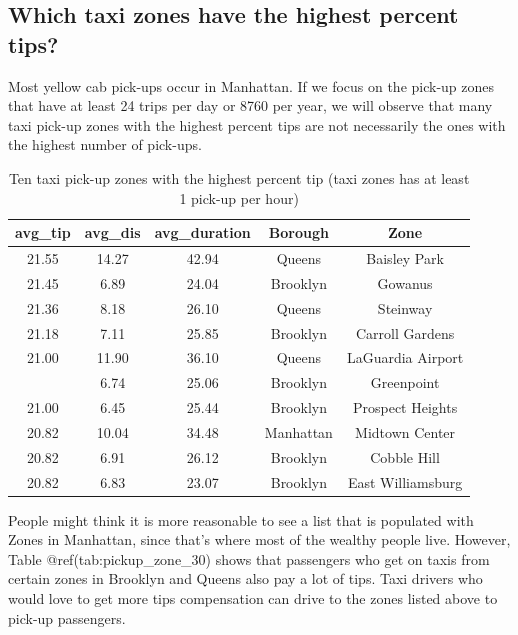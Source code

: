 \documentclass[12pt,twoside]{reedthesis}
\newenvironment{Shaded}{\begin{snugshade}}{\end{snugshade}}
\newcommand{\KeywordTok}[1]{\textcolor[rgb]{0.13,0.29,0.53}{\textbf{#1}}}
\newcommand{\DecValTok}[1]{\textcolor[rgb]{0.00,0.00,0.81}{#1}}
\newcommand{\StringTok}[1]{\textcolor[rgb]{0.31,0.60,0.02}{#1}}
\newcommand{\CommentTok}[1]{\textcolor[rgb]{0.56,0.35,0.01}{\textit{#1}}}
\newcommand{\OperatorTok}[1]{\textcolor[rgb]{0.81,0.36,0.00}{\textbf{#1}}}
\newcommand{\NormalTok}[1]{#1}
\theoremstyle{definition}
\theoremstyle{definition}
\theoremstyle{definition}
\theoremstyle{remark}
\begin{document}
\subsection{Which taxi zones have the highest percent
tips?}\label{which-taxi-zones-have-the-highest-percent-tips}

Most yellow cab pick-ups occur in Manhattan. If we focus on the pick-up
zones that have at least 24 trips per day or 8760 per year, we will
observe that many taxi pick-up zones with the highest percent tips are
not necessarily the ones with the highest number of pick-ups.
\begin{Shaded}
\end{Shaded}
\begin{table}

\caption{\label{tab:unnamed-chunk-48}Ten taxi pick-up zones with the highest percent tip (taxi zones has at least 1 pick-up per hour)}
\centering
\begin{tabular}[t]{ccccc}
\toprule
avg\_tip & avg\_dis & avg\_duration & Borough & Zone\\
\midrule
21.55 & 14.27 & 42.94 & Queens & Baisley Park\\
21.45 & 6.89 & 24.04 & Brooklyn & Gowanus\\
21.36 & 8.18 & 26.10 & Queens & Steinway\\
21.18 & 7.11 & 25.85 & Brooklyn & Carroll Gardens\\
21.00 & 11.90 & 36.10 & Queens & LaGuardia Airport\\
\addlinespace
21.00 & 6.74 & 25.06 & Brooklyn & Greenpoint\\
21.00 & 6.45 & 25.44 & Brooklyn & Prospect Heights\\
20.82 & 10.04 & 34.48 & Manhattan & Midtown Center\\
20.82 & 6.91 & 26.12 & Brooklyn & Cobble Hill\\
20.82 & 6.83 & 23.07 & Brooklyn & East Williamsburg\\
\bottomrule
\end{tabular}
\end{table}
People might think it is more reasonable to see a list that is populated
with Zones in Manhattan, since that's where most of the wealthy people
live. However, Table @ref(tab:pickup\_zone\_30) shows that passengers
who get on taxis from certain zones in Brooklyn and Queens also pay a
lot of tips. Taxi drivers who would love to get more tips compensation
can drive to the zones listed above to pick-up passengers.
\end{document}
